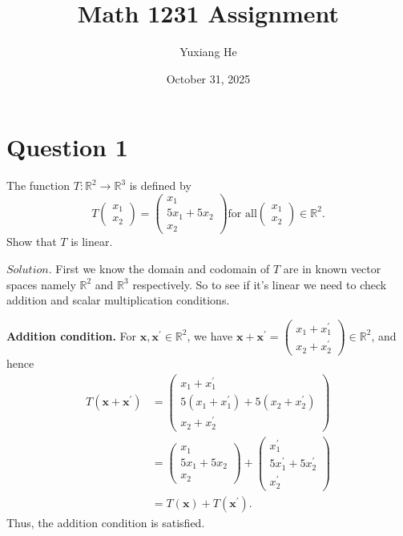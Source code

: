 \documentclass{article}
\title{Math 1231 Assignment}
\author{Yuxiang He}
\date{October 31, 2025}
\begin{document}
\maketitle
\newpage


\section*{Question 1}
The function $T:\mathbb{R}^2\to\mathbb{R}^3$ is defined by
\begin{equation*}
  T\begin{pmatrix} 
    x_1 \\ 
    x_2 
  \end{pmatrix}
  = \begin{pmatrix} x_1 \\ 
    5x_1 + 5x_2 \\ 
    x_2 
  \end{pmatrix}
  \text{for all}
  \begin{pmatrix}x_1\\x_2\end{pmatrix}\in\mathbb{R}^2.
\end{equation*}
Show that $T$ is linear.

$Solution$. First we know the domain and codomain of
$T$ are in known vector spaces namely $\mathbb{R}^2$ and $\mathbb{R}^3$ respectively. 
So to see if it's linear we need to check addition and scalar 
multiplication conditions.

\textbf{Addition condition.} For $\mathbf{x},
 \mathbf{x}^\prime\in\mathbb{R}^2$, 
we have $\mathbf{x}+ \mathbf{x}^\prime = 
\begin{pmatrix}
  x_1 + x_1^\prime\\
  x_2 + x_2^\prime
\end{pmatrix}
\in \mathbb{R}^2$, and hence
\begin{equation*}
\begin{aligned}
  T(\mathbf{x} + \mathbf{x}^\prime) &=
  \begin{pmatrix}
    x_1 + x_1^\prime\\
    5(x_1 + x_1^\prime) + 5(x_2 + x_2^\prime)\\ 
    x_2 + x_2^\prime
  \end{pmatrix}
  \\ &= 
  \begin{pmatrix}
    x_1\\
    5x_1 + 5x_2\\ 
    x_2
  \end{pmatrix}
  +
  \begin{pmatrix}
    x_1^\prime\\
    5x_1^\prime + 5x_2^\prime\\ 
    x_2^\prime
  \end{pmatrix}
  \\&= 
  T(\mathbf{x}) +T(\mathbf{x}^\prime).
\end{aligned}
\end{equation*}
Thus, the addition condition is satisfied.
\end{document}
